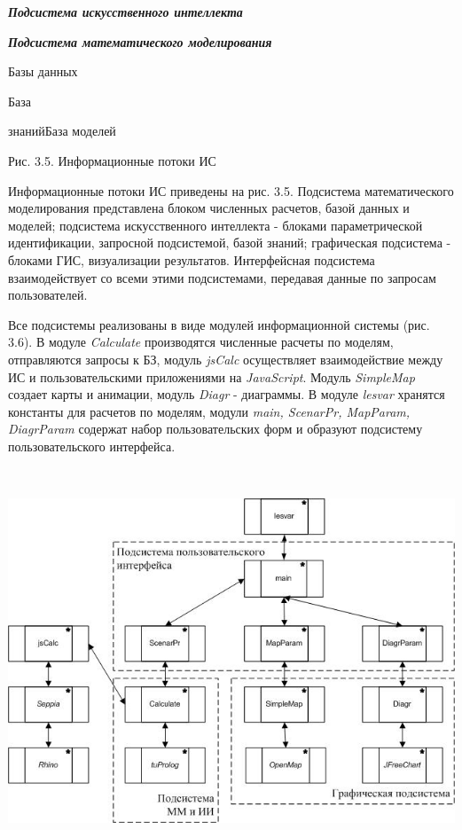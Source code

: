 \documentclass{article}
\begin{document}
\textit{\textbf{Подсистема искусственного интеллекта}}

\textit{\textbf{Подсистема математического моделирования}}

\begin{center}
Базы данных

База 

знанийБаза моделей\fancyfoot[LE]{\thepage{}}
\fancyfoot[LO]{\thepage{}}

Рис. 3.5. Информационные потоки ИС
\end{center}

Информационные потоки ИС приведены на рис. 
3.5. Подсистема математического моделирования 
представлена блоком численных расчетов, базой 
данных и моделей; подсистема искусственного 
интеллекта - блоками параметрической идентификации, 
запросной подсистемой, базой знаний; графическая 
подсистема - блоками ГИС, визуализации результатов. 
Интерфейсная подсистема взаимодействует со 
всеми этими подсистемами, передавая данные 
по запросам пользователей.

Все подсистемы реализованы в виде модулей информационной 
системы (рис. 3.6). В модуле \textit{Calculate} производятся 
численные расчеты по моделям, отправляются 
запросы к БЗ, модуль \textit{jsCalc} осуществляет взаимодействие 
между ИС и пользовательскими приложениями 
на \textit{JavaScript}. Модуль \textit{SimpleMap} создает карты 
и анимации, модуль \textit{Diagr} - диаграммы. В модуле 
\textit{lesvar} хранятся константы для расчетов по 
моделям, модули \textit{main, ScenarPr, MapParam, DiagrParam} содержат 
набор пользовательских форм и образуют подсистему 
пользовательского интерфейса.

\includegraphics[width=449pt, height=326pt, keepaspectratio=true]{asyaDisser9_3-fig003.png}
\end{document}
